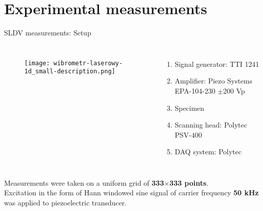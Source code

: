 \documentclass[10pt,aspectratio=169,dvipsnames]{beamer} %
\begin{document}
	\section*{Experimental measurements}
	\begin{frame}[t]{SLDV measurements: Setup}
		\begin{columns}[T]
			\begin{figure}
				\texttt{[image: wibrometr-laserowy-1d\_small-description.png]}
			\end{figure}
			\begin{enumerate}
				\item Signal generator: TTI 1241 
				\item Amplifier: Piezo Systems EPA-104-230 $\pm$200 Vp
				\item Specimen
				\item Scanning head: Polytec PSV-400
				\item DAQ system: Polytec
			\end{enumerate}
		\end{columns}
		{\small
			Measurements were taken on a uniform grid of \textbf{333$\times$333 points}.\\
			Excitation in the form of Hann windowed sine signal of carrier frequency \textbf{50 kHz} was applied to piezoelectric transducer.}
	\end{frame}
\end{document}
